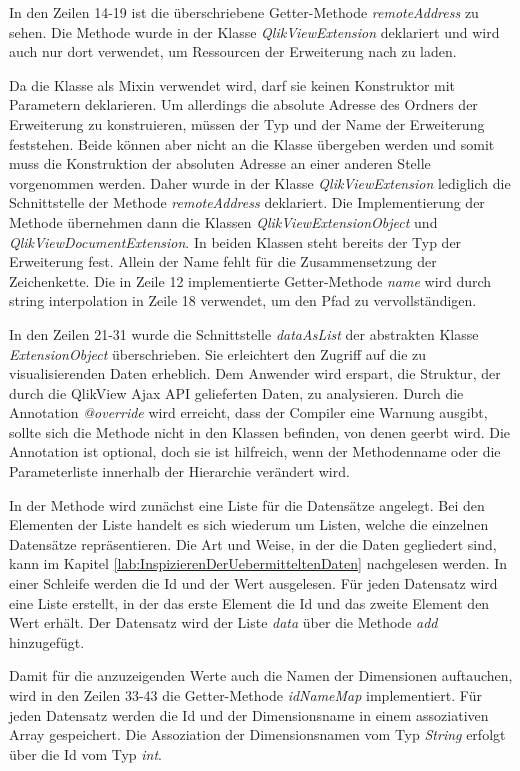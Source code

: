 In den Zeilen 14-19 ist die überschriebene Getter-Methode \textit{remoteAddress} zu sehen. Die Methode wurde in der Klasse \textit{QlikViewExtension} deklariert und wird auch nur dort verwendet, um Ressourcen der Erweiterung nach zu laden. 

Da die Klasse als Mixin verwendet wird, darf sie keinen Konstruktor mit Parametern deklarieren. Um allerdings die absolute Adresse des Ordners der Erweiterung zu konstruieren, müssen der Typ und der Name der Erweiterung feststehen. Beide können aber nicht an die Klasse übergeben werden und somit muss die Konstruktion der absoluten Adresse an einer anderen Stelle vorgenommen werden. Daher wurde in der Klasse \textit{QlikViewExtension} lediglich die Schnittstelle der Methode \textit{remoteAddress} deklariert. Die Implementierung der Methode übernehmen dann die Klassen \textit{QlikViewExtensionObject} und \textit{QlikViewDocumentExtension}. In beiden Klassen steht bereits der Typ der Erweiterung fest. Allein der Name fehlt für die Zusammensetzung der Zeichenkette. Die in Zeile 12 implementierte Getter-Methode \textit{name} wird durch string interpolation in Zeile 18 verwendet, um den Pfad zu vervollständigen.



In den Zeilen 21-31 wurde die Schnittstelle \textit{dataAsList} der abstrakten Klasse \textit{ExtensionObject} überschrieben. Sie erleichtert den Zugriff auf die zu visualisierenden Daten erheblich. Dem Anwender wird erspart, die Struktur, der durch die QlikView Ajax API gelieferten Daten, zu analysieren. Durch die Annotation \textit{@override} wird erreicht, dass der Compiler eine Warnung ausgibt, sollte sich die Methode nicht in den Klassen befinden, von denen geerbt wird. Die Annotation ist optional, doch sie ist hilfreich, wenn der Methodenname oder die Parameterliste innerhalb der Hierarchie verändert wird.

In der Methode wird zunächst eine Liste für die Daten\-sätze angelegt. Bei den Elementen der Liste handelt es sich wiederum um Listen, welche die einzelnen Daten\-sätze repräsentieren. Die Art und Weise, in der die Daten gegliedert sind, kann im Kapitel \ref{lab:InspizierenDerUebermitteltenDaten} nachgelesen werden. In einer Schleife werden die Id und der Wert ausgelesen. Für jeden Daten\-satz wird eine Liste erstellt, in der das erste Element die Id und das zweite Element den Wert erhält. Der Daten\-satz wird der Liste \textit{data} über die Methode \textit{add} hinzugefügt.
\newpage


Damit für die anzuzeigenden Werte auch die Namen der Dimensionen auftauchen, wird in den Zeilen 33-43 die Getter-Methode \textit{idNameMap} implementiert. Für jeden Daten\-satz werden die Id und der Dimensionsname in einem assoziativen Array gespeichert. Die Assoziation der Dimensionsnamen vom Typ \textit{String} erfolgt über die Id vom Typ \textit{int}.

